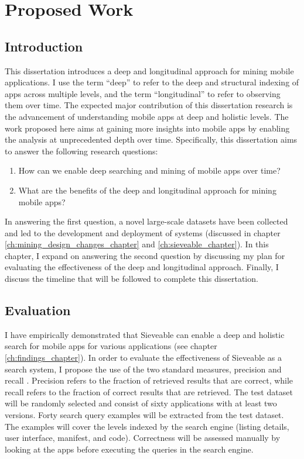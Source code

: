 \chapter{Proposed Work}

\section{Introduction}
\label{ch:propsal}
This dissertation introduces a deep and longitudinal approach for mining mobile applications.
I use the term ``deep'' to refer to the deep and structural indexing of apps across multiple levels, and the term ``longitudinal'' to refer to observing them over time.
The expected major contribution of this dissertation research is the advancement of understanding mobile apps at deep and holistic levels.
The work proposed here aims at gaining more insights into mobile apps by enabling the analysis at unprecedented depth over time.
Specifically, this dissertation aims to answer the following research questions:
\begin{enumerate}
	\item How can we enable deep searching and mining of mobile apps over time?
	\item What are the benefits of the deep and longitudinal approach for mining mobile apps?
\end{enumerate}

In answering the first question, a novel large-scale datasets have been collected and led to the development and deployment of systems (discussed in chapter \ref{ch:mining_design_changes_chapter} and \ref{ch:sieveable_chapter}).
In this chapter, I expand on answering the second question by discussing my plan for evaluating the effectiveness of the deep and longitudinal approach.
Finally, I discuss the timeline that will be followed to complete this dissertation.

\section{Evaluation}
I have empirically demonstrated that Sieveable can enable a deep and holistic search for mobile apps for various applications (see chapter \ref{ch:findings_chapter}).
In order to evaluate the effectiveness of Sieveable as a search system, I propose the use of the two standard measures, precision and recall \cite{manning_2008_intro_to_IR}.
Precision refers to the fraction of retrieved results that are correct, while recall refers to the fraction of correct results that are retrieved.
The test dataset will be randomly selected and consist of sixty applications with at least two versions.
Forty search query examples will be extracted from the test dataset.
The examples will cover the levels indexed by the search engine (listing details, user interface, manifest, and code).
Correctness will be assessed manually by looking at the apps before executing the queries in the search engine.


